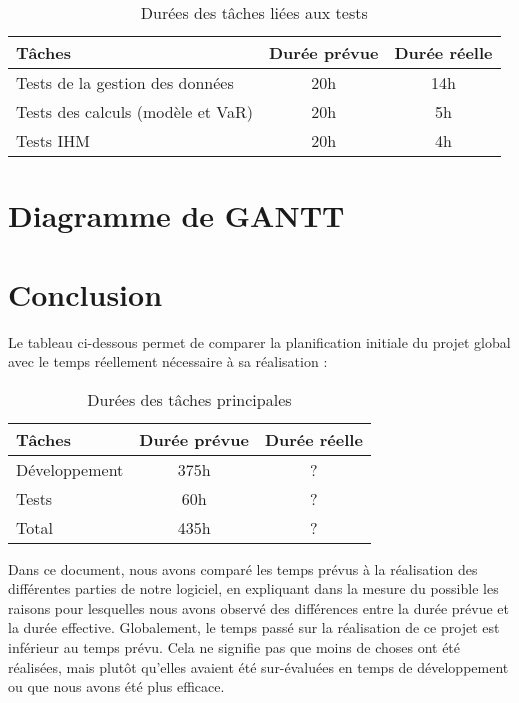 \documentclass[a4paper]{report}
\begin{document}
\begin{table}[H]
\centering
  \begin{tabularx}{0.8\textwidth}{| X | c | c |}
    \hline
	Tâches & Durée prévue & Durée réelle \\
    \hline
    Tests de la gestion des données & 20h & 14h\\
    Tests des calculs (modèle et VaR) & 20h & 5h\\
    Tests IHM & 20h & 4h\\
    \hline
  \end{tabularx}
  \caption{Durées des tâches liées aux tests}
\end{table}


\chapter{Diagramme de GANTT}


\chapter{Conclusion}

Le tableau ci-dessous permet de comparer la planification initiale du projet global avec le temps réellement nécessaire à sa réalisation :

\begin{table}[H]
\centering
  \begin{tabularx}{0.8\textwidth}{| X | c | c |}
    \hline
	Tâches & Durée prévue & Durée réelle \\
    \hline
    Développement & 375h & ?\\
    Tests & 60h & ?\\
    \hline
	Total & 435h & ?\\
    \hline
  \end{tabularx}
  \caption{Durées des tâches principales}
\end{table}

Dans ce document, nous avons comparé les temps prévus à la réalisation des différentes parties de notre logiciel, en expliquant dans la mesure du possible les raisons pour lesquelles nous avons observé des différences entre la durée prévue et la durée effective.
Globalement, le temps passé sur la réalisation de ce projet est inférieur au temps prévu.
Cela ne signifie pas que moins de choses ont été réalisées, mais plutôt qu'elles avaient été sur-évaluées en temps de développement ou que nous avons été plus efficace.
\end{document}
